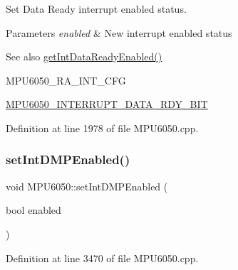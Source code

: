 Set Data Ready interrupt enabled status. 
\begin{DoxyParams}{Parameters}
{\em enabled} & New interrupt enabled status \\
\hline
\end{DoxyParams}
\begin{DoxySeeAlso}{See also}
\mbox{\hyperlink{classMPU6050_ae15f6043a74c9c9bf9754824802ce8d3}{get\+Int\+Data\+Ready\+Enabled()}} 

M\+P\+U6050\+\_\+\+R\+A\+\_\+\+I\+N\+T\+\_\+\+C\+FG 

\mbox{\hyperlink{MPU6050_8h_af58fafd4db7755e66e0beab54e88c41d}{M\+P\+U6050\+\_\+\+I\+N\+T\+E\+R\+R\+U\+P\+T\+\_\+\+D\+A\+T\+A\+\_\+\+R\+D\+Y\+\_\+\+B\+IT}} 
\end{DoxySeeAlso}


Definition at line 1978 of file M\+P\+U6050.\+cpp.


\begin{DoxyCode}{0}

\end{DoxyCode}
\mbox{\label{classMPU6050_a889d29900cb0dd16e0199c13822f0f88}} 
\subsubsection{\texorpdfstring{setIntDMPEnabled()}{setIntDMPEnabled()}}
{\footnotesize\ttfamily void M\+P\+U6050\+::set\+Int\+D\+M\+P\+Enabled (\begin{DoxyParamCaption}\item[{bool}]{enabled }\end{DoxyParamCaption})}



Definition at line 3470 of file M\+P\+U6050.\+cpp.



